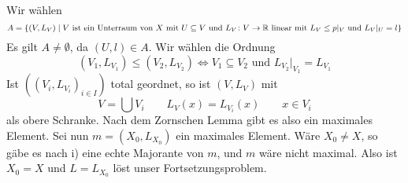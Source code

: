 \begin{beweis}
\begin{enumerate}
		Wir w\"ahlen
		\[ A=\lbrace (V,L_V)\mid V\text{ ist ein Unterraum von }X\text{ mit }U\subseteq V\text{ und }L_V\colon V\rightarrow\mathbb{R}\text{ linear mit }L_V\leq p|_V\text{ und }L_V|_U=l\rbrace \]
		Es gilt $ A\neq\emptyset $, da $ (U,l)\in A $. Wir w\"ahlen die Ordnung
		\[ (V_1,L_{V_1})\leq(V_2,L_{V_2})\Leftrightarrow V_1\subseteq V_2\text{ und }L_{V_2}|_{V_1}=L_{V_1} \]
		Ist $ ((V_i,L_{V_i})_{i\in I}) $ total geordnet, so ist $ (V,L_V) $ mit
		\[ V=\bigcup V_i\qquad L_V(x)=L_{V_i}(x)\qquad x\in V_i \] 
		als obere Schranke. Nach dem Zornschen Lemma gibt es also ein maximales Element. Sei nun $ m=(X_0,L_{X_0}) $ ein maximales Element. W\"are $ X_0\neq X $, so g\"abe es nach i) eine echte Majorante von $ m $, und $ m $ w\"are nicht maximal. Also ist $ X_0=X $ und $ L=L_{X_0} $ l\"ost unser Fortsetzungsproblem.
	\end{enumerate}
\end{beweis}